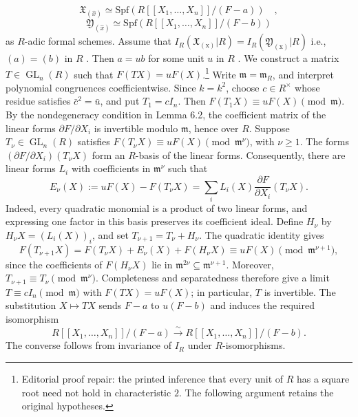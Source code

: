 \begin{equation*}
\mathfrak{X}_{(\widehat{x})} \simeq \mathrm{Spf}(R[[X_1,\dots,X_n]]/(F - a)) \quad ,
\end{equation*}
\begin{equation*}
\mathfrak{Y}_{(\widehat{x})} \simeq \mathrm{Spf}(R[[X_1,\dots,X_n]]/(F - b))
\end{equation*}
as $R$-adic formal schemes. Assume that  $I_R(\mathfrak{X}_{(\mathrm{x})}|R) = I_R(\mathfrak{Y}_{(\mathrm{x})}|R)$  i.e.,
$(a) = (b)$ in $R$ . Then $a = ub$ for some unit $u$ in $R$ . We construct a matrix $T\in\operatorname{GL}_n(R)$ such that $F(TX)=uF(X)$.\footnote{Editorial proof repair: the printed inference that every unit of $R$ has a square root need not hold in characteristic $2$. The following argument retains the original hypotheses.} Write $\mathfrak m=\mathfrak m_R$, and interpret polynomial congruences coefficientwise. Since $k=k^2$, choose $c\in R^\times$ whose residue satisfies $\bar c^2=\bar u$, and put $T_1=cI_n$. Then $F(T_1X)\equiv uF(X)\pmod{\mathfrak m}$. By the nondegeneracy condition in Lemma 6.2, the coefficient matrix of the linear forms $\partial F/\partial X_i$ is invertible modulo $\mathfrak m$, hence over $R$.  Suppose $T_\nu\in\operatorname{GL}_n(R)$ satisfies $F(T_\nu X)\equiv uF(X)\pmod{\mathfrak m^\nu}$, with $\nu\geq1$. The forms $(\partial F/\partial X_i)(T_\nu X)$ form an $R$-basis of the linear forms. Consequently, there are linear forms $L_i$ with coefficients in $\mathfrak m^\nu$ such that \[ E_\nu(X):=uF(X)-F(T_\nu X)  =\sum_i L_i(X)\frac{\partial F}{\partial X_i}(T_\nu X). \] Indeed, every quadratic monomial is a product of two linear forms, and expressing one factor in this basis preserves its coefficient ideal. Define $H_\nu$ by $H_\nu X=(L_i(X))_i$, and set $T_{\nu+1}=T_\nu+H_\nu$. The quadratic identity gives \[ F(T_{\nu+1}X)=F(T_\nu X)+E_\nu(X)+F(H_\nu X)  \equiv uF(X)\pmod{\mathfrak m^{\nu+1}}, \] since the coefficients of $F(H_\nu X)$ lie in $\mathfrak m^{2\nu}\subseteq\mathfrak m^{\nu+1}$. Moreover, $T_{\nu+1}\equiv T_\nu\pmod{\mathfrak m^\nu}$. Completeness and separatedness therefore give a limit $T\equiv cI_n\pmod{\mathfrak m}$ with $F(TX)=uF(X)$; in particular, $T$ is invertible. The substitution $X\mapsto TX$ sends $F-a$ to $u(F-b)$ and induces the required isomorphism \[ R[[X_1,\ldots,X_n]]/(F-a)  \xrightarrow{\ \sim\ } R[[X_1,\ldots,X_n]]/(F-b). \] The converse follows from invariance of $I_R$ under $R$-isomorphisms.

